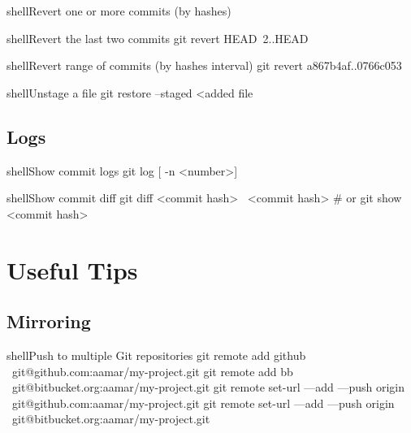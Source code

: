 \documentclass[10pt,a4paper]{article}
\begin{document}
\begin{multicols}{3}
\begin{codebox}{shell}{Revert one or more commits (by hashes)}
\end{codebox}

\begin{codebox}{shell}{Revert the last two commits}
git revert HEAD~2..HEAD

\end{codebox}

\begin{codebox}{shell}{Revert range of commits (by hashes interval)}
git revert a867b4af..0766c053

\end{codebox}

\begin{codebox}{shell}{Unstage a file}
git restore --staged <added file

\end{codebox}

\subsection{Logs}

\begin{codebox}{shell}{Show commit logs}
git log [ -n <number>]

\end{codebox}

\begin{codebox}{shell}{Show commit diff}
git diff <commit hash>~   <commit hash>
# or 
 git show <commit hash>

\end{codebox}

{\centering\section{Useful Tips}}

\subsection{Mirroring}

\begin{codebox}{shell}{Push to multiple Git repositories}
git remote add github \
      git@github.com:aamar/my-project.git 
git remote add bb \ 
      git@bitbucket.org:aamar/my-project.git 
git remote set-url ---add ---push origin \
      git@github.com:aamar/my-project.git
git remote set-url ---add ---push origin \
      git@bitbucket.org:aamar/my-project.git

\end{codebox}


\end{multicols}
\end{document}
